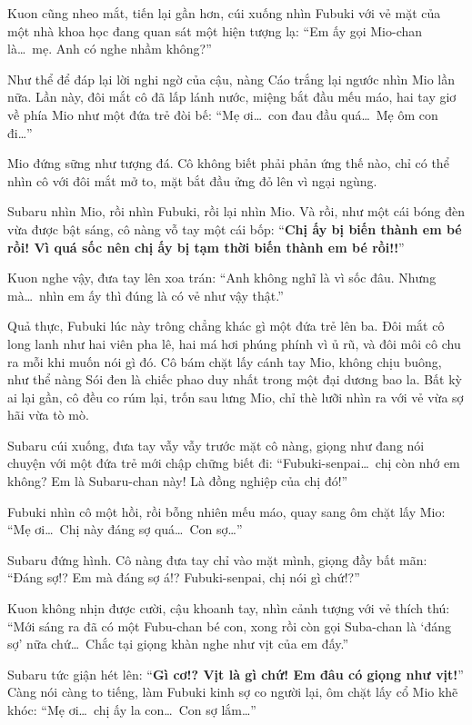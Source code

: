 \documentclass[../main.tex]{subfiles}
\begin{document}
Kuon cũng nheo mắt, tiến lại gần hơn, cúi xuống nhìn Fubuki với vẻ mặt của một nhà khoa học đang quan sát một hiện tượng lạ: ``Em ấy gọi Mio-chan là\dots\ mẹ. Anh có nghe nhầm không?''

Như thể để đáp lại lời nghi ngờ của cậu, nàng Cáo trắng lại ngước nhìn Mio lần nữa. Lần này, đôi mắt cô đã lấp lánh nước, miệng bắt đầu mếu máo, hai tay giơ về phía Mio như một đứa trẻ đòi bế: ``Mẹ ơi\dots\ con đau đầu quá\dots\ Mẹ ôm con đi\dots''

Mio đứng sững như tượng đá. Cô không biết phải phản ứng thế nào, chỉ có thể nhìn cô với đôi mắt mở to, mặt bắt đầu ửng đỏ lên vì ngại ngùng.

Subaru nhìn Mio, rồi nhìn Fubuki, rồi lại nhìn Mio. Và rồi, như một cái bóng đèn vừa được bật sáng, cô nàng vỗ tay một cái bốp: ``\textbf{Chị ấy bị biến thành em bé rồi! Vì quá sốc nên chị ấy bị tạm thời biến thành em bé rồi!!}''

Kuon nghe vậy, đưa tay lên xoa trán: ``Anh không nghĩ là vì sốc đâu. Nhưng mà\dots\ nhìn em ấy thì đúng là có vẻ như vậy thật.''

Quả thực, Fubuki lúc này trông chẳng khác gì một đứa trẻ lên ba. Đôi mắt cô long lanh như hai viên pha lê, hai má hơi phúng phính vì ủ rũ, và đôi môi cô chu ra mỗi khi muốn nói gì đó. Cô bám chặt lấy cánh tay Mio, không chịu buông, như thể nàng Sói đen là chiếc phao duy nhất trong một đại dương bao la. Bất kỳ ai lại gần, cô đều co rúm lại, trốn sau lưng Mio, chỉ thè lưỡi nhìn ra với vẻ vừa sợ hãi vừa tò mò.

Subaru cúi xuống, đưa tay vẫy vẫy trước mặt cô nàng, giọng như đang nói chuyện với một đứa trẻ mới chập chững biết đi: ``Fubuki-senpai\dots\ chị còn nhớ em không? Em là Subaru-chan này! Là đồng nghiệp của chị đó!''

Fubuki nhìn cô một hồi, rồi bỗng nhiên mếu máo, quay sang ôm chặt lấy Mio: ``Mẹ ơi\dots\ Chị này đáng sợ quá\dots\ Con sợ\dots''

Subaru đứng hình. Cô nàng đưa tay chỉ vào mặt mình, giọng đầy bất mãn: ``Đáng sợ!? Em mà đáng sợ á!? Fubuki-senpai, chị nói gì chứ!?''

Kuon không nhịn được cười, cậu khoanh tay, nhìn cảnh tượng với vẻ thích thú: ``Mới sáng ra đã có một Fubu-chan bé con, xong rồi còn gọi Suba-chan là `đáng sợ' nữa chứ\dots\ Chắc tại giọng khàn nghe như vịt của em đấy.''

Subaru tức giận hét lên: ``\textbf{Gì cơ!? Vịt là gì chứ! Em đâu có giọng như vịt!}'' Càng nói càng to tiếng, làm Fubuki kinh sợ co người lại, ôm chặt lấy cổ Mio khẽ khóc: ``Mẹ ơi\dots\ chị ấy la con\dots\ Con sợ lắm\dots''
\end{document}
